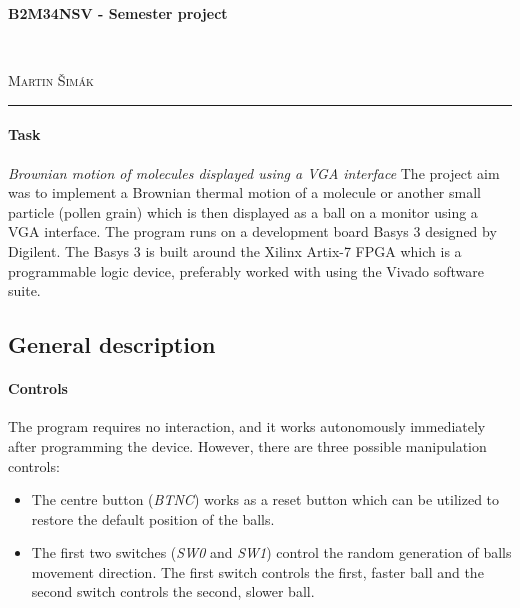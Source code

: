 \documentclass[11pt,a4paper]{article}
\begin{document}

    \begin{center}
        {\LARGE\textbf{B2M34NSV - Semester project}}\\[3mm]
        \begin{minipage}{0.4\textwidth}
            \begin{flushleft}
                \textsc{}
            \end{flushleft}
        \end{minipage}
        ~
        \begin{minipage}{0.4\textwidth}
            \begin{flushright}
                \textsc{Martin Šimák}
            \end{flushright}
        \end{minipage}
        \noindent\rule{14.5cm}{0.4pt}
    \end{center}

    \paragraph{Task} \emph{Brownian motion of molecules displayed using a VGA interface}
    The project aim was to implement a Brownian thermal motion of a molecule or another small particle (pollen grain) which is then displayed as a ball on a monitor using a VGA interface. The program runs on a development board Basys 3 designed by Digilent. The Basys 3 is built around the Xilinx Artix-7 FPGA which is a programmable logic device, preferably worked with using the Vivado software suite.

    \subsection*{General description}

        \paragraph{Controls} The program requires no interaction, and it works autonomously immediately after programming the device. However, there are three possible manipulation controls:
        \begin{itemize}
            \item The centre button (\emph{BTNC}) works as a reset button which can be utilized to restore the default position of the balls.
            \item The first two switches (\emph{SW0} and \emph{SW1}) control the random generation of balls movement direction. The first switch controls the first, faster ball and the second switch controls the second, slower ball.
        \end{itemize}
\end{document}
